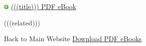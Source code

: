 \documentclass{article}
\begin{document}
\begin{center}
\end{center}

\vspace{24pt}

\begin{center}
  \includegraphics[width=0.02\textwidth]{download.png}
  \href{http://(((domain)))/download/(((title|replace(' ', '-')))).pdf}{(((title))) PDF eBook}
\end{center}

\clearpage

(((related)))

\noindent Back to Main Website \href{http://(((domain)))}{Download PDF eBooks}
\end{document}
